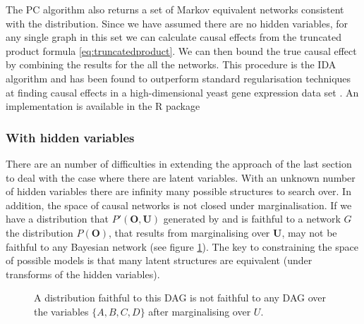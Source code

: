 \documentclass[11pt,a4paper,oneside]{book}
\theoremstyle{plain}
\theoremstyle{definition}
\begin{document}
The PC algorithm also returns a set of Markov equivalent networks consistent with the distribution. Since we have assumed there are no hidden variables, for any single graph in this set we can calculate causal effects from the truncated product formula \ref{eq:truncatedproduct}. We can then bound the true causal effect by combining the results for the all the networks. This procedure is the IDA algorithm \citep{Maathuis2009} and has been found to outperform standard regularisation techniques at finding causal effects in a high-dimensional yeast gene expression data set \citep{Maathuis2010}. An implementation is available in the R package \citep{Kalisch2012} 

\subsubsection{With hidden variables}
There are an number of difficulties in extending the approach of the last section to deal with the case where there are latent variables. With an unknown number of hidden variables there are infinity many possible structures to search over. In addition, the space of causal networks is not closed under marginalisation. If we have a distribution that $P'(\boldsymbol{O},\boldsymbol{U})$ generated by and is faithful to a network $G$ the distribution $P(\boldsymbol{O})$, that results from marginalising over $\boldsymbol{U}$, may not be faithful to any Bayesian network (see figure \ref{fig:DAGSnotclosed}). The key to constraining the space of possible models is that many latent structures are equivalent (under transforms of the hidden variables).

\begin{figure}
\centering
\caption{A distribution faithful to this DAG is not faithful to any DAG over the variables $\{A,B,C,D\}$ after marginalising over $U$. }
\label{fig:DAGSnotclosed}
\end{figure}
 
\end{document}
